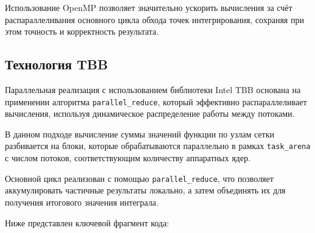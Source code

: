 \documentclass[a4paper,14pt]{article}
\begin{document}
Использование OpenMP позволяет значительно ускорить вычисления за счёт распараллеливания основного цикла обхода точек интегрирования, сохраняя при этом точность и корректность результата.

\subsection{Технология TBB}

Параллельная реализация с использованием библиотеки Intel TBB основана на применении алгоритма \texttt{parallel\_reduce}, который эффективно распараллеливает вычисления, используя динамическое распределение работы между потоками.

В данном подходе вычисление суммы значений функции по узлам сетки разбивается на блоки, которые обрабатываются параллельно в рамках \texttt{task\_arena} с числом потоков, соответствующим количеству аппаратных ядер.

Основной цикл реализован с помощью \texttt{parallel\_reduce}, что позволяет аккумулировать частичные результаты локально, а затем объединять их для получения итогового значения интеграла.

Ниже представлен ключевой фрагмент кода:
\end{document}
